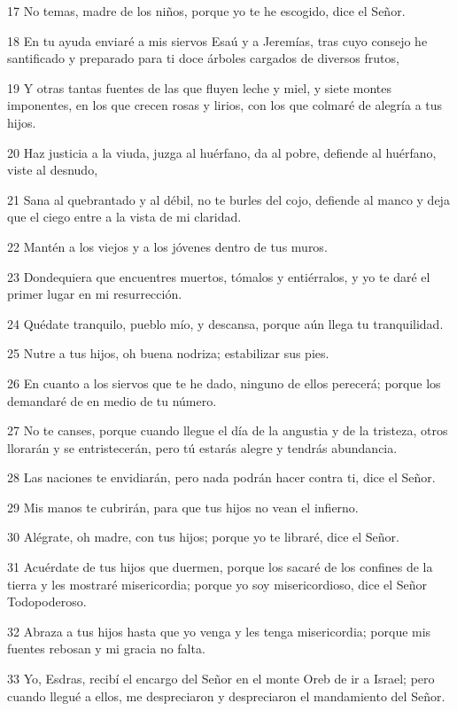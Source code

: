 \par 17 No temas, madre de los niños, porque yo te he escogido, dice el Señor.
\par 18 En tu ayuda enviaré a mis siervos Esaú y a Jeremías, tras cuyo consejo he santificado y preparado para ti doce árboles cargados de diversos frutos,
\par 19 Y otras tantas fuentes de las que fluyen leche y miel, y siete montes imponentes, en los que crecen rosas y lirios, con los que colmaré de alegría a tus hijos.
\par 20 Haz justicia a la viuda, juzga al huérfano, da al pobre, defiende al huérfano, viste al desnudo,
\par 21 Sana al quebrantado y al débil, no te burles del cojo, defiende al manco y deja que el ciego entre a la vista de mi claridad.
\par 22 Mantén a los viejos y a los jóvenes dentro de tus muros.
\par 23 Dondequiera que encuentres muertos, tómalos y entiérralos, y yo te daré el primer lugar en mi resurrección.
\par 24 Quédate tranquilo, pueblo mío, y descansa, porque aún llega tu tranquilidad.
\par 25 Nutre a tus hijos, oh buena nodriza; estabilizar sus pies.
\par 26 En cuanto a los siervos que te he dado, ninguno de ellos perecerá; porque los demandaré de en medio de tu número.
\par 27 No te canses, porque cuando llegue el día de la angustia y de la tristeza, otros llorarán y se entristecerán, pero tú estarás alegre y tendrás abundancia.
\par 28 Las naciones te envidiarán, pero nada podrán hacer contra ti, dice el Señor.
\par 29 Mis manos te cubrirán, para que tus hijos no vean el infierno.
\par 30 Alégrate, oh madre, con tus hijos; porque yo te libraré, dice el Señor.
\par 31 Acuérdate de tus hijos que duermen, porque los sacaré de los confines de la tierra y les mostraré misericordia; porque yo soy misericordioso, dice el Señor Todopoderoso.
\par 32 Abraza a tus hijos hasta que yo venga y les tenga misericordia; porque mis fuentes rebosan y mi gracia no falta.
\par 33 Yo, Esdras, recibí el encargo del Señor en el monte Oreb de ir a Israel; pero cuando llegué a ellos, me despreciaron y despreciaron el mandamiento del Señor.
